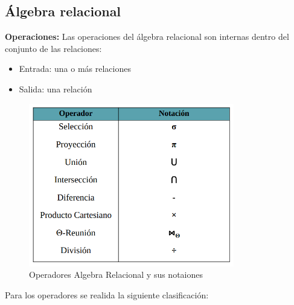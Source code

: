 \documentclass[a4paper,11pt]{article}
\begin{document}
\subsection{Álgebra relacional}
\textbf{Operaciones:} Las operaciones del álgebra relacional son internas dentro del conjunto de las relaciones:

\begin{itemize}
\item Entrada: una o más relaciones
\item Salida: una relación
\end{itemize}

\begin{figure}[h]
\centering
\caption{Operadores Algebra Relacional y sus notaiones}
\includegraphics[scale=1,width=0.8\textwidth]{operaciones_algebra.png}
\end{figure}

Para los operadores se realida la siguiente clasificación:
\end{document}

